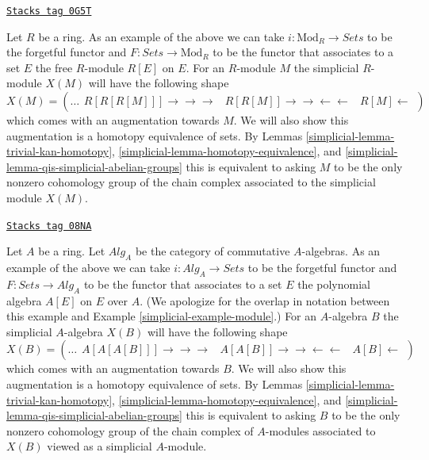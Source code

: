 \begin{example}[Module]
\label{simplicial-example-module}
\href{https://stacks.math.columbia.edu/tag/0G5T}{\texttt{Stacks tag 0G5T}}

Let $R$ be a ring. As an example of the above we can take
$i : \text{Mod}_R \to \textit{Sets}$ to be the forgetful functor
and $F : \textit{Sets} \to \text{Mod}_R$ to be the functor that associates
to a set $E$ the free $R$-module $R[E]$ on $E$. For an $R$-module $M$
the simplicial $R$-module $X(M)$ will have the following shape
$$
X(M) =
\left( \ldots
\begin{array}{ccc}R[R[R[M]]]
\longrightarrow\longrightarrow\longrightarrow & R[R[M]]
\longrightarrow\longrightarrow\longleftarrow\longleftarrow & R[M]
\longleftarrow\end{array}
\right)
$$
which comes with an augmentation towards $M$. We will also show this
augmentation is a homotopy equivalence of sets. By Lemmas
\ref{simplicial-lemma-trivial-kan-homotopy}, \ref{simplicial-lemma-homotopy-equivalence}, and
\ref{simplicial-lemma-qis-simplicial-abelian-groups}
this is equivalent to asking $M$ to be the only nonzero cohomology
group of the chain complex associated to the simplicial module $X(M)$.
\end{example}

\begin{example}
\label{simplicial-example-polynomial-algebra}
\href{https://stacks.math.columbia.edu/tag/08NA}{\texttt{Stacks tag 08NA}}

Let $A$ be a ring. Let $\textit{Alg}_A$ be the category of commutative
$A$-algebras. As an example of the above we can take
$i : \textit{Alg}_A \to \textit{Sets}$ to be the forgetful functor
and $F : \textit{Sets} \to \textit{Alg}_A$ to be the functor that associates
to a set $E$ the polynomial algebra $A[E]$ on $E$ over $A$.
(We apologize for the overlap in notation between this example and
Example \ref{simplicial-example-module}.) For an $A$-algebra $B$
the simplicial $A$-algebra $X(B)$ will have the following shape
$$
X(B) = \left( \ldots
\begin{array}{ccc}A[A[A[B]]]
\longrightarrow\longrightarrow\longrightarrow & A[A[B]]
\longrightarrow\longrightarrow\longleftarrow\longleftarrow & A[B]
\longleftarrow\end{array}
\right)
$$
which comes with an augmentation towards $B$. We will also show this
augmentation is a homotopy equivalence of sets. By Lemmas
\ref{simplicial-lemma-trivial-kan-homotopy}, \ref{simplicial-lemma-homotopy-equivalence}, and
\ref{simplicial-lemma-qis-simplicial-abelian-groups}
this is equivalent to asking $B$ to be the only nonzero cohomology
group of the chain complex of $A$-modules
associated to $X(B)$ viewed as a simplicial $A$-module.
\end{example}

